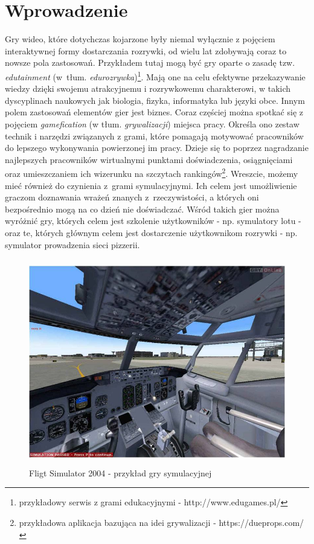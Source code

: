 \chapter*{Wprowadzenie}
Gry wideo, które dotychczas kojarzone były niemal wyłącznie z pojęciem interaktywnej formy dostarczania rozrywki, od wielu lat zdobywają coraz to nowsze pola zastosowań. Przykładem tutaj mogą być gry oparte o zasadę tzw. \emph{edutainment} (w~tłum. \emph{edurozrywka})\footnote{przykładowy serwis z grami edukacyjnymi - http://www.edugames.pl/}. Mają one na celu efektywne przekazywanie wiedzy dzięki swojemu atrakcyjnemu i rozrywkowemu charakterowi, w takich dyscyplinach naukowych jak biologia, fizyka, informatyka lub języki obce. 
Innym polem zastosowań elementów gier jest biznes. Coraz częściej można spotkać się z pojęciem \emph{gamefication} (w tłum. \emph{grywalizacji}) miejsca pracy. Określa ono zestaw technik i narzędzi związanych z grami, które pomagają motywować pracowników do lepszego wykonywania powierzonej im pracy. Dzieje się to poprzez nagradzanie najlepszych pracowników wirtualnymi punktami doświadczenia, osiągnięciami oraz umieszczaniem ich wizerunku na szczytach rankingów\footnote{przykładowa aplikacja bazująca na idei grywalizacji - https://dueprops.com/}.
Wreszcie, możemy mieć również do czynienia z~grami symulacyjnymi. Ich celem jest umożliwienie graczom doznawania wrażeń znanych z~rzeczywistości, a których oni bezpośrednio mogą na co dzień nie doświadczać. Wśród takich gier można wyróżnić gry, których celem jest szkolenie użytkowników - np. symulatory lotu - oraz te, których głównym celem jest dostarczenie użytkownikom rozrywki - np. symulator prowadzenia sieci pizzerii.

\begin{figure}
\begin{center}
	\includegraphics[width=120mm,height=90mm]{images/flightSim}
	\caption{Fligt Simulator 2004 - przykład gry symulacyjnej}
\end{center}
\end{figure}

